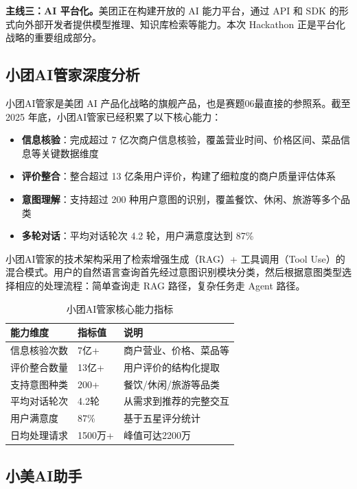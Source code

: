 \documentclass[12pt,a4paper]{ctexart}
\begin{document}
\textbf{主线三：AI 平台化。}美团正在构建开放的 AI 能力平台，通过 API 和 SDK 的形式向外部开发者提供模型推理、知识库检索等能力。本次 Hackathon 正是平台化战略的重要组成部分。

\subsection{小团AI管家深度分析}

小团AI管家是美团 AI 产品化战略的旗舰产品，也是赛题06最直接的参照系。截至 2025 年底，小团AI管家已经积累了以下核心能力：

\begin{itemize}[leftmargin=2em]
  \item \textbf{信息核验}：完成超过 7 亿次商户信息核验，覆盖营业时间、价格区间、菜品信息等关键数据维度
  \item \textbf{评价整合}：整合超过 13 亿条用户评价，构建了细粒度的商户质量评估体系
  \item \textbf{意图理解}：支持超过 200 种用户意图的识别，覆盖餐饮、休闲、旅游等多个品类
  \item \textbf{多轮对话}：平均对话轮次 4.2 轮，用户满意度达到 87\%
\end{itemize}

小团AI管家的技术架构采用了检索增强生成（RAG）+ 工具调用（Tool Use）的混合模式。用户的自然语言查询首先经过意图识别模块分类，然后根据意图类型选择相应的处理流程：简单查询走 RAG 路径，复杂任务走 Agent 路径。

\begin{table}[H]
\centering
\caption{小团AI管家核心能力指标}
\label{tab:xiaotuan-metrics}
\renewcommand{\arraystretch}{1.3}
\begin{tabular}{p{4cm} p{3cm} p{5cm}}
\toprule
\textbf{能力维度} & \textbf{指标值} & \textbf{说明} \\
\midrule
信息核验次数 & 7亿+ & 商户营业、价格、菜品等 \\
评价整合数量 & 13亿+ & 用户评价的结构化提取 \\
支持意图种类 & 200+ & 餐饮/休闲/旅游等品类 \\
平均对话轮次 & 4.2轮 & 从需求到推荐的完整交互 \\
用户满意度 & 87\% & 基于五星评分统计 \\
日均处理请求 & 1500万+ & 峰值可达2200万 \\
\bottomrule
\end{tabular}
\end{table}

\subsection{小美AI助手}
\end{document}
